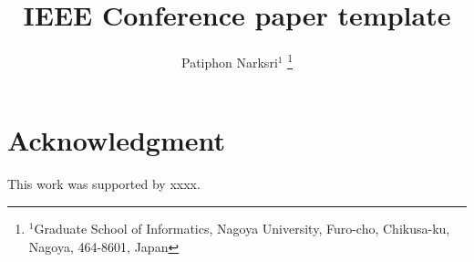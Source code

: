 \documentclass[letterpaper, 10 pt, conference]{templates/ieeeconf}  %
\title{\LARGE \bf
IEEE Conference paper template
}
\author{
	Patiphon Narksri$^{1}$
\thanks{$^{1}$Graduate School of Informatics, Nagoya University, Furo-cho, Chikusa-ku, Nagoya, 464-8601, Japan}%
}
\begin{document}
\maketitle
\thispagestyle{empty}
\pagestyle{empty}








\addtolength{\textheight}{-0.9cm}   %


\section*{Acknowledgment}
This work was supported by xxxx.


\def\url#1{} %


\end{document}
